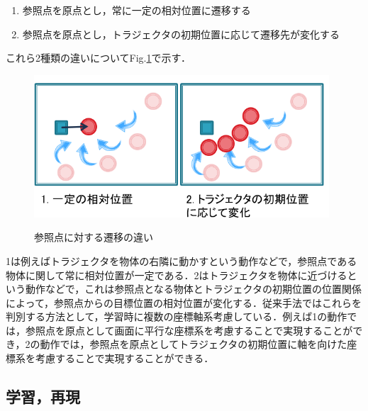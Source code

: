 	\begin{enumerate}
		\item 参照点を原点とし，常に一定の相対位置に遷移する
		\item 参照点を原点とし，トラジェクタの初期位置に応じて遷移先が変化する
	\end{enumerate}
これら2種類の違いについてFig.\ref{figure:2_difference_displacement}で示す．
	\begin{figure}[t]
		\begin{center}
			\includegraphics[width=11cm]{figure2_2.png} \\ %
			\caption{参照点に対する遷移の違い}
			\label{figure:2_difference_displacement}
		\end{center}
	\end{figure}
1は例えばトラジェクタを物体の右隣に動かすという動作などで，参照点である物体に関して常に相対位置が一定である．2はトラジェクタを物体に近づけるという動作などで，これは参照点となる物体とトラジェクタの初期位置の位置関係によって，参照点からの目標位置の相対位置が変化する．従来手法ではこれらを判別する方法として，学習時に複数の座標軸系考慮している．例えば1の動作では，参照点を原点として画面に平行な座標系を考慮することで実現することができ，2の動作では，参照点を原点としてトラジェクタの初期位置に軸を向けた座標系を考慮することで実現することができる．

\subsection{学習，再現}

